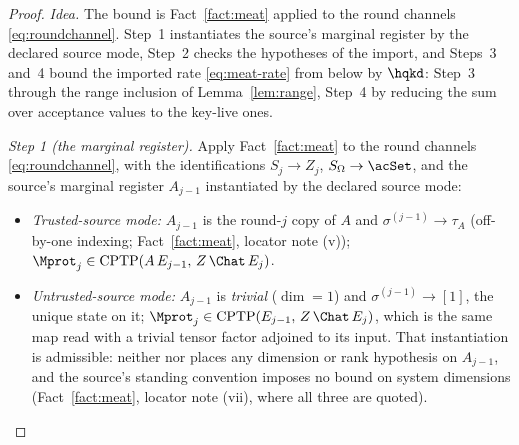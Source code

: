 \begin{proof}
\emph{Idea.} The bound is Fact~\ref{fact:meat} applied to the round
channels \eqref{eq:roundchannel}. Step~1 instantiates the source's marginal
register by the declared source mode, Step~2 checks the hypotheses of the
import, and Steps~3 and~4 bound the imported rate \eqref{eq:meat-rate} from
below by $\hqkd$: Step~3 through the range inclusion of
Lemma~\ref{lem:range}, Step~4 by reducing the sum over acceptance values to
the key-live ones.

\emph{Step 1 (the marginal register).} Apply Fact~\ref{fact:meat} to the
round channels \eqref{eq:roundchannel}, with the identifications
$S_j\to Z_j$, $S_{\Omega}\to\acSet$, and the source's marginal register
$A_{j-1}$ instantiated by the declared source mode:
\begin{itemize}[leftmargin=1.6em]
\item[] \emph{Trusted-source mode:} $A_{j-1}$ is the round-$j$ copy of
$A$ and $\sigma^{(j-1)}\to\tau_A$ (off-by-one indexing;
Fact~\ref{fact:meat}, locator note (v));
$\Mprot_j\in\mathrm{CPTP}(A\,E_{j-1},\,Z\,\Chat\,E_j)$.
\item[] \emph{Untrusted-source mode:} $A_{j-1}$ is \emph{trivial}
($\dim=1$) and $\sigma^{(j-1)}\to[1]$, the unique state on it;
$\Mprot_j\in\mathrm{CPTP}(E_{j-1},\,Z\,\Chat\,E_j)$, which is the same
map read with a trivial tensor factor adjoined to its input. That
instantiation is admissible: neither
\cite[Thm.~4.2a]{arqand2025meat} nor
\cite[Def.~4.2, Eq.~(98)]{arqand2025meat} places any dimension or rank
hypothesis on $A_{j-1}$, and the source's standing convention imposes
no bound on system dimensions
(Fact~\ref{fact:meat}, locator note (vii), where all three are quoted).
\end{itemize}


\end{proof}
